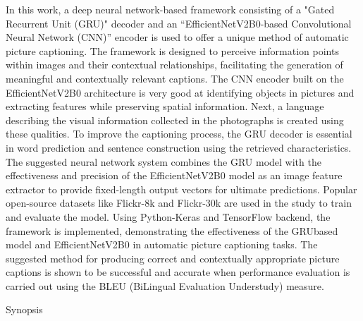 \documentclass[oneside,a4paper,12pt]{report}
\begin{document}
In this work, a deep neural network-based framework consisting of a "Gated Recurrent Unit (GRU)" decoder and an “EfficientNetV2B0-based Convolutional Neural Network (CNN)” encoder is used to offer a unique method of automatic picture captioning. The framework is designed to perceive information points within images and their contextual relationships, facilitating the generation of meaningful and contextually relevant captions. The CNN encoder built on the EfficientNetV2B0 architecture is very good at identifying objects in pictures and extracting features while preserving spatial information. Next, a language describing the visual information collected in the photographs is created using these qualities. To improve the captioning process, the GRU decoder is essential in word prediction and sentence construction using the retrieved characteristics. The suggested neural network system combines the GRU model with the effectiveness and precision of the EfficientNetV2B0 model as an image feature extractor to provide fixed-length output vectors for ultimate predictions. Popular open-source datasets like Flickr-8k and Flickr-30k are used in the study to train and evaluate the model. Using Python-Keras and TensorFlow backend, the framework is implemented, demonstrating the effectiveness of the GRUbased model and EfficientNetV2B0 in automatic picture captioning tasks. The suggested method for producing correct and contextually appropriate picture captions is shown to be successful and accurate when performance evaluation is carried out using the BLEU (BiLingual Evaluation Understudy) measure.
\newpage
{}
\newpage
{\fontsize{16}{15} \bfseries \LARGE \selectfont \centerline{Synopsis}}
\vspace{10mm}
\end{document}
